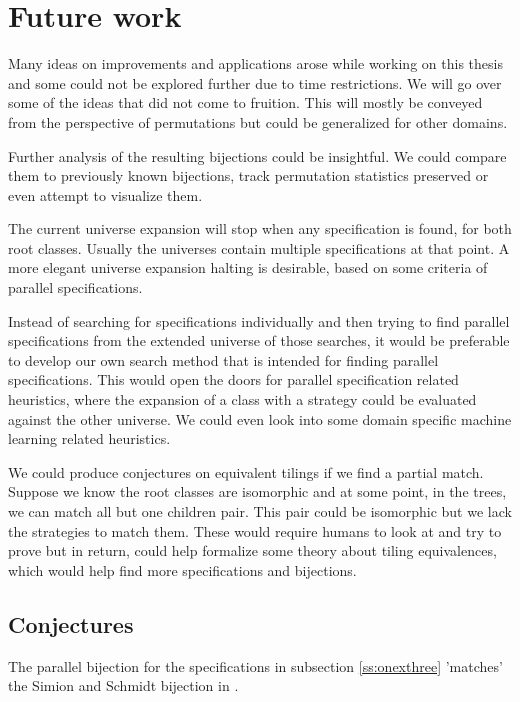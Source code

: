 \label{ch:conclusion}

\section{Future work}\label{s:fw}
Many ideas on improvements and applications arose while working on this thesis and some could not be explored further due to time restrictions. We will go over some of the ideas that did not come to fruition. This will mostly be conveyed from the perspective of permutations but could be generalized for other domains.

Further analysis of the resulting bijections could be insightful. We could compare them to previously known bijections, track permutation statistics preserved or even attempt to visualize them.

The current universe expansion will stop when any specification is found, for both root classes. Usually the universes contain multiple specifications at that point. A more elegant universe expansion halting is desirable, based on some criteria of parallel specifications.

Instead of searching for specifications individually and then trying to find parallel specifications from the extended universe of those searches, it would be preferable to develop our own search method that is intended for finding parallel specifications. This would open the doors for parallel specification related heuristics, where the expansion of a class with a strategy could be evaluated against the other universe. We could even look into some domain specific machine learning related heuristics. 

We could produce conjectures on equivalent tilings if we find a partial match. Suppose we know the root classes are isomorphic and at some point, in the trees, we can match all but one children pair. This pair could be isomorphic but we lack the strategies to match them. These would require humans to look at and try to prove but in return, could help formalize some theory about tiling equivalences, which would help find more specifications and bijections.

\subsection{Conjectures}
\begin{conjecture}
The parallel bijection for the specifications in subsection \ref{ss:onexthree} 'matches' the Simion and Schmidt bijection in \cite{simionandschmidt}.
\end{conjecture}



